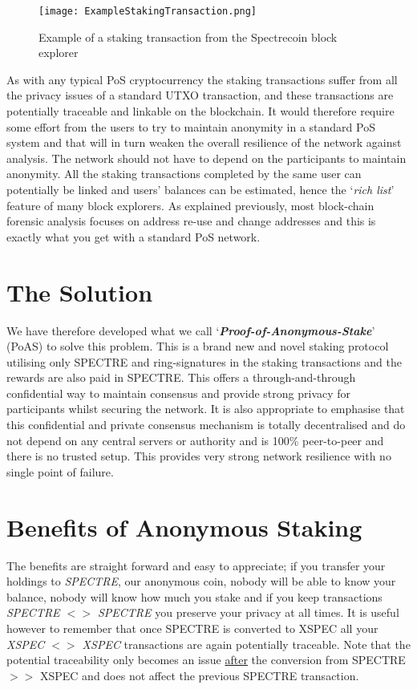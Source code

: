 \begin{figure}[h]
	\caption{Example of a staking transaction from the Spectrecoin block explorer}
	\centering
	\texttt{[image: ExampleStakingTransaction.png]}
\end{figure}



As with any typical PoS cryptocurrency the staking transactions suffer 
from all the privacy issues of a standard UTXO transaction, and these 
transactions are potentially traceable and linkable on the blockchain. 
It would therefore require some effort from the users to try to maintain 
anonymity in a standard PoS system and that will in turn weaken the overall 
resilience of the network against analysis. The network should not have to 
depend on the participants to maintain anonymity. All the staking 
transactions completed by the same user can potentially be linked and users’ 
balances can be estimated, hence the ‘\textit{rich list}’ feature of many 
block explorers. As explained previously, most block-chain forensic analysis 
focuses on address re-use and change addresses and this is exactly what you 
get with a standard PoS network.



\section{The Solution}
We have therefore developed what we call ‘\textbf{\textit{Proof-of-Anonymous-Stake}}’ 
(PoAS) to solve this problem. This is a brand new and novel staking protocol 
utilising only SPECTRE and ring-signatures in the staking transactions and 
the rewards are also paid in SPECTRE. This offers a through-and-through 
confidential way to maintain consensus and provide strong privacy for 
participants whilst securing the network. It is also appropriate to emphasise 
that this confidential and private consensus mechanism is totally 
decentralised and do not depend on any central servers or authority and is 
100\% peer-to-peer and there is no trusted setup. This provides very strong 
network resilience with no single point of failure.



\section{Benefits of Anonymous Staking}
The benefits are straight forward and easy to appreciate; if you transfer 
your holdings to \textit{SPECTRE}, our anonymous coin, nobody will be able 
to know your balance, nobody will know how much you stake and if you keep 
transactions \textit{SPECTRE $<>$ SPECTRE} you preserve your privacy at all 
times. It is useful however to remember that once SPECTRE is converted to 
XSPEC all your \textit{XSPEC $<>$ XSPEC} transactions are again potentially 
traceable. Note that the potential traceability only becomes an issue 
\underline{after} the conversion from SPECTRE $>>$ XSPEC and does not affect 
the previous SPECTRE transaction.



